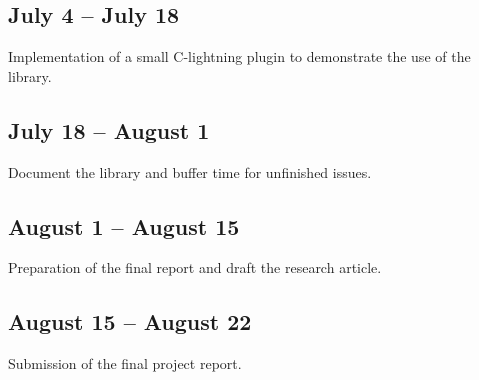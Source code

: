     \subsection*{July 4 -- July 18}
    Implementation of a small C-lightning plugin to demonstrate the use of the
    library.
    
    \subsection*{July 18 -- August 1}
    Document the library and buffer time for unfinished issues.
    
    \subsection*{August 1 -- August 15}
    Preparation of the final report and draft the research article.
    
    \subsection*{August 15 -- August 22}
    Submission of the final project report.
